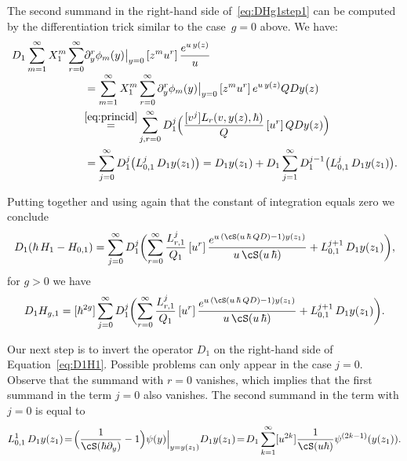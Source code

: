The second summand in the right-hand side of~\eqref{eq:DHg1step1} can be computed by the differentiation trick similar to the case~$g=0$ above. We have:\vspace*{-3pt}
\begin{align*}
D_1\sum_{m=1}^\infty X_1^m\sum_{r=0}^\infty&
\partial_y^r\phi_m(y)\big|_{y=0}\,[z^{m}u^r]\,
\frac{e^{u\,y(z)}}{u}\\[-3pt]
&=\sum_{m=1}^\infty X_1^m\sum_{r=0}^\infty
\partial_y^r\phi_m(y)\big|_{y=0}\,[z^{m}u^r]\,
e^{u\,y(z)}QDy(z)
\\&\!\mathop{=}^{\eqref{eq:princid}}
\sum_{j,r=0}^\infty D_1^j \Bigl(\frac{[v^j]L_r(v,y(z),\hbar)}{Q}\,[u^r]\, QDy(z) \Bigr)
\\&=\sum_{j=0}^\infty D_1^j\bigl(L_{0,1}^j\,D_1y(z_1)\bigr)
=D_1y(z_1)+D_1\sum_{j=1}^\infty D_1^{j-1}\bigl(L_{0,1}^j\, D_1y(z_1)\bigr).
\end{align*}

Putting together and using again that the constant of integration equals zero we conclude\vspace*{-5pt}
\begin{equation*}\label{eq:D1H1}
D_1(\hbar\,H_{1}-H_{0,1})=
\sum_{j=0}^\infty D_1^j\biggl(\sum_{r=0}^\infty\frac{L_{r,1}^j}{Q_1}
\,[u^r]\, \frac{e^{u\,(\cS(u\,\hbar\,Q D)-1)y(z_1)}}{u\,\cS(u\,\hbar)}+L_{0,1}^{j+1}\, D_1y(z_1) \biggr),
\end{equation*}
\ie for $g>0$ we have\vspace*{-5pt}
\begin{equation*}
D_1 H_{g,1}=[\hbar^{2g}]
\sum_{j=0}^\infty D_1^j \biggl(\sum_{r=0}^\infty\frac{L_{r,1}^j}{Q_1}
\,[u^r]\, \frac{e^{u\,(\cS(u\,\hbar\,Q D)-1)y(z_1)}}{u\,\cS(u\,\hbar)}+L_{0,1}^{j+1}\, D_1y(z_1) \biggr).
\end{equation*}

Our next step is to invert the operator $D_1$ on the right-hand side of Equation~\ref{eq:D1H1}. Possible problems can only appear in the case $j=0$. Observe that the summand with $r=0$ vanishes, which implies that the first summand in the term $j=0$ also vanishes. The second summand in the term with $j=0$ is equal to\vspace*{-5pt}
\[
L_{0,1}^1\,D_1 y(z_1)
\!=\!\Bigl(\frac1{\cS(\hbar \partial_y)}-1\Bigr)\psi(y)\Big|_{y=y(z_1)}D_1 y(z_1)
\!=\!D_1\sum_{k=1}^\infty[u^{2k}]\frac1{\cS(u \hbar)}\psi^{(2k-1)}(y(z_1)).
\]

